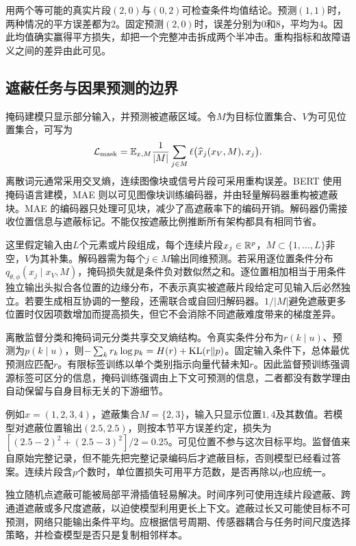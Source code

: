 用两个等可能的真实片段$(2,0)$与$(0,2)$可检查条件均值结论。预测$(1,1)$时，两种情况的平方误差都为$2$。固定预测$(2,0)$时，误差分别为$0$和$8$，平均为$4$。因此均值确实赢得平方损失，却把一个完整冲击拆成两个半冲击。重构指标和故障语义之间的差异由此可见。

\subsection{遮蔽任务与因果预测的边界}
掩码建模只显示部分输入，并预测被遮蔽区域。令$M$为目标位置集合、$V$为可见位置集合，可写为
\begin{equation}
 \mathcal L_{\mathrm{mask}}
 =\mathbb{E}_{x,M}\frac1{|M|}\sum_{j\in M}
 \ell\bigl(\widehat x_j(x_V,M),x_j\bigr).
\end{equation}
离散词元通常采用交叉熵，连续图像块或信号片段可采用重构误差。BERT 使用掩码语言建模，MAE 则以可见图像块训练编码器，并由轻量解码器重构被遮蔽块\cite{devlin2019bert,he2022mae}。MAE 的编码器只处理可见块，减少了高遮蔽率下的编码开销。解码器仍需接收位置信息与遮蔽标记。不能仅按遮蔽比例推断所有架构都具有相同节省。

这里假定输入由$L$个元素或片段组成，每个连续片段$x_j\in\mathbb{R}^p$，$M\subset\{1,\ldots,L\}$非空，$V$为其补集。解码器需为每个$j\in M$输出同维预测。若采用逐位置条件分布$q_{\theta,\phi}(x_j\mid x_V,M)$，掩码损失就是条件负对数似然之和。逐位置相加相当于用条件独立输出头拟合各位置的边缘分布，不表示真实被遮蔽片段给定可见输入后必然独立。若要生成相互协调的一整段，还需联合或自回归解码器。$1/|M|$避免遮蔽更多位置时仅因项数增加而提高损失，但它不会消除不同遮蔽难度带来的梯度差异。

离散监督分类和掩码词元分类共享交叉熵结构。令真实条件分布为$r(k\mid u)$、预测为$p(k\mid u)$，则$-\sum_kr_k\log p_k=H(r)+\operatorname{KL}(r\|p)$。固定输入条件下，总体最优预测应匹配$r$。有限标签训练以单个类别指示向量代替未知$r$。因此监督预训练强调源标签可区分的信息，掩码训练强调由上下文可预测的信息，二者都没有数学理由自动保留与自身目标无关的下游细节。

例如$x=(1,2,3,4)$，遮蔽集合$M=\{2,3\}$，输入只显示位置$1,4$及其数值。若模型对遮蔽位置输出$(2.5,2.5)$，则按本节平方误差约定，损失为$[(2.5-2)^2+(2.5-3)^2]/2=0.25$。可见位置不参与这次目标平均。监督值来自原始完整记录，但不能先把完整记录编码后才遮蔽目标，否则模型已经看过答案。连续片段含$p$个数时，单位置损失可用平方范数，是否再除以$p$也应统一。

独立随机点遮蔽可能被局部平滑插值轻易解决。时间序列可使用连续片段遮蔽、跨通道遮蔽或多尺度遮蔽，以迫使模型利用更长上下文。遮蔽过长又可能使目标不可预测，网络只能输出条件平均。应根据信号周期、传感器耦合与任务时间尺度选择策略，并检查模型是否只是复制相邻样本。

